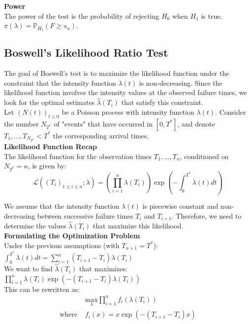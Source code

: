 \documentclass{journalstyle}
\begin{document}
\noindent\textbf{Power} \\
The power of the test is the probability of rejecting $H_0$ when $H_1$ is true. \\
$\pi(\lambda) = \mathbb{P}_{H_1}(F \geq s_{\alpha})$.


\subsection{Boswell's Likelihood Ratio Test}

The goal of Boswell's test is to maximize the likelihood function under the constraint that the intensity function $\lambda(t)$ is non-decreasing.
Since the likelihood function involves the intensity values at the observed failure times, we look for the optimal estimates $\hat{\lambda}(T_i)$ that satisfy this constraint. \\

Let $(N(t))_{t \geq 0}$ be a Poisson process with intensity function $\lambda(t)$.
Consider the number $N_{T^*}$ of "events" that have occurred in $[0, T^*]$, and denote $T_1, \ldots, T_{N_{T^*}} < T^*$ the corresponding arrival times. \\


\noindent\textbf{Likelihood Function Recap} \\
The likelihood function for the observation times $T_1, \ldots, T_n$, conditioned on $N_{T^*} = n$, is given by:
$$
\mathcal{L}((T_i)_{1 \leq i \leq n}; \lambda) = \left(\prod_{i=1}^n \lambda(T_i)\right) \exp\left(-\int_0^{T^*} \lambda(t) dt\right)
$$

We assume that the intensity function $\lambda(t)$ is piecewise constant and non-decreasing between successive failure times $T_{i}$ and $T_{i+1}$.
Therefore, we need to determine the values $\hat{\lambda}(T_i)$ that maximize this likelihood. \\

\noindent\textbf{Formulating the Optimization Problem} \\
Under the previous assumptions (with $T_{n+1} = T^*$): \\
$\int_0^{T^*} \lambda(t) dt = \sum_{i=1}^n (T_{i+1} - T_i) \lambda(T_i)$ \\

\noindent We want to find $\hat{\lambda}(T_i)$ that maximizes: \\
$\prod_{i=1}^{n} \lambda(T_i) \exp(-(T_{i+1} - T_i) \lambda(T_i))$ \\

This can be rewritten as: \\
\begin{equation*}
    \begin{split}
        &\underset{\lambda}{\text{max}} \prod_{i=1}^{n} f_i(\lambda(T_i)) \\
        \text{where } &f_i(x) = x \exp(-(T_{i+1} - T_i) x)
    \end{split}
    \label{eq:boswell_optimization_problem}
\end{equation*}
\end{document}
